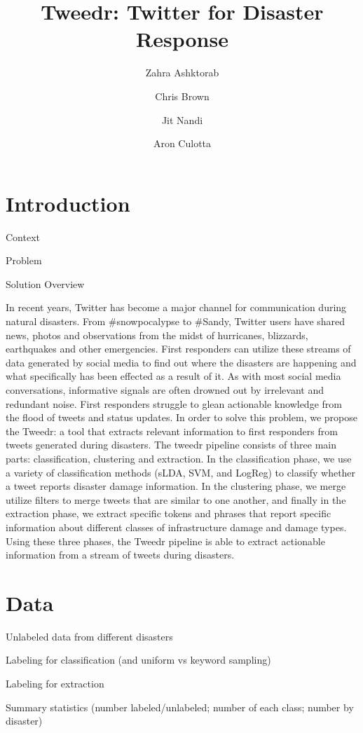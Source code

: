 \documentclass{article}
\title{Tweedr: Twitter for Disaster Response}
\author{Zahra Ashktorab \and Chris Brown \and Jit Nandi \and Aron Culotta}
\begin{document}
\maketitle

\section{Introduction}

\begin{outline}
  \item Context
  \item Problem
  \item Solution Overview
\end{outline}
In recent years, Twitter has become a major channel for communication during natural disasters. From #snowpocalypse to #Sandy, Twitter users have shared news, photos and observations from the midst of hurricanes, blizzards, earthquakes and other emergencies. First responders can utilize these streams of data generated by social media to find out where the disasters are happening and what specifically has been effected as a result of it.
As with most social media conversations, informative signals are often drowned out by irrelevant and redundant noise. First responders struggle to glean actionable knowledge from the flood of tweets and status updates.
In order to solve this problem, we propose the Tweedr: a tool that extracts relevant information to first responders from tweets generated during disasters. The tweedr pipeline consists of three main parts: classification, clustering and extraction. In the classification phase, we use a variety of classification methods (sLDA, SVM, and LogReg) to classify whether a tweet reports disaster damage information. In the clustering phase, we merge utilize filters to merge tweets that are similar to one another, and finally in the extraction phase, we extract specific tokens and phrases that report specific information about different classes of infrastructure damage and damage types. Using these three phases, the Tweedr pipeline is able to extract actionable information from a stream of tweets during disasters.

\section{Data}
\begin{outline}
  \item Unlabeled data from different disasters
  \item Labeling for classification (and uniform vs keyword sampling)
  \item Labeling for extraction
  \item Summary statistics (number labeled/unlabeled; number of each class; number by disaster)
\end{outline}
\end{document}
